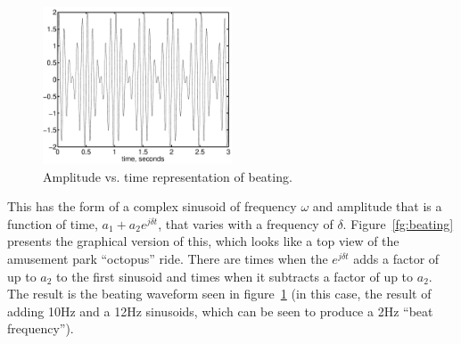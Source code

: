 \begin{figure} 
\centerline{\includegraphics[width=0.5\textwidth]{ch-physical/beating-waveform}}
\caption{Amplitude vs. time representation of beating.\label{fg:beating-waveform}} 
\end{figure} 

This has the form of a complex sinusoid of frequency $\omega$ and
amplitude that is a function of time, $a_1 + a_2 e^{j\delta t}$, that
varies with a frequency of $\delta$. Figure~\ref{fg:beating} presents
the graphical version of this, which looks like a top view of the
amusement park ``octopus'' ride. There are times when the $e^{j\delta
  t}$ adds a factor of up to $a_2$ to the first sinusoid and times
when it subtracts a factor of up to $a_2$. The result is the beating
waveform seen in figure~\ref{fg:beating-waveform} (in this case, the
result of adding 10Hz and a 12Hz sinusoids, which can be seen to
produce a 2Hz ``beat frequency'').


